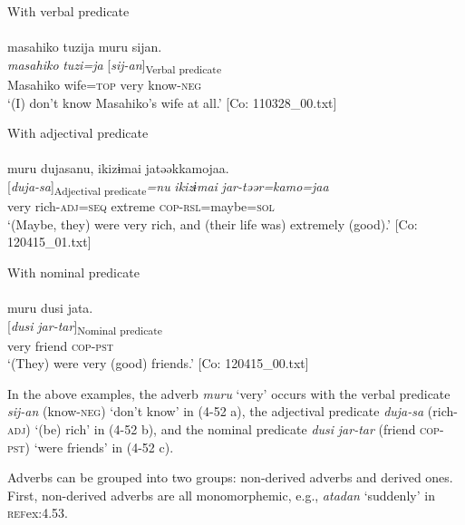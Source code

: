 \ea  \ea With verbal predicate \label{ex:4.52}\\\\
\glll    masahiko  tuzija  muru  sijan.\\
    \textit{masahiko}  \textit{tuzi=ja}  \textit{}  [\textit{sij-an}]\textsubscript{Verbal predicate}\\
    Masahiko  wife=\textsc{top}  very  know-\textsc{neg}\\
    \glt     ‘(I) don’t know Masahiko’s wife at all.’ [Co: 110328\_00.txt]

  \ex With adjectival predicate\\\\
\glll    muru  dujasanu,  ikizɨmai  jatəəkkamojaa.\\
    \textit{}  [\textit{duja-sa}]\textsubscript{Adjectival predicate}\textit{=nu}  \textit{ikizɨmai}  \textit{jar-təər=kamo=jaa}\\
    very  rich-\textsc{adj}=\textsc{seq}  extreme  \textsc{cop}-\textsc{rsl}=maybe=\textsc{sol}\\
    \glt     ‘(Maybe, they) were very rich, and (their life was) extremely (good).’ [Co: 120415\_01.txt]

\ex With nominal predicate\\\\
\glll  muru  dusi  jata.\\
    \textit{}  [\textit{dusi}  \textit{jar-tar}]\textsubscript{Nominal predicate}\\
    very  friend  \textsc{cop}-\textsc{pst}\\
    \glt     ‘(They) were very (good) friends.’ [Co: 120415\_00.txt]
    \z
\z

In the above examples, the adverb \textit{muru} ‘very’ occurs with the verbal predicate \textit{sij-an} (know-\textsc{neg}) ‘don’t know’ in (4-52 a), the adjectival predicate \textit{duja-sa} (rich-\textsc{adj}) ‘(be) rich’ in (4-52 b), and the nominal predicate \textit{dusi} \textit{jar-tar} (friend \textsc{cop}-\textsc{pst}) ‘were friends’ in (4-52 c).

  Adverbs can be grouped into two groups: non-derived adverbs and derived ones. First, non-derived adverbs are all monomorphemic, e.g., \textit{atadan} ‘suddenly’ in \textsc{ref}{ex:4.53}.

